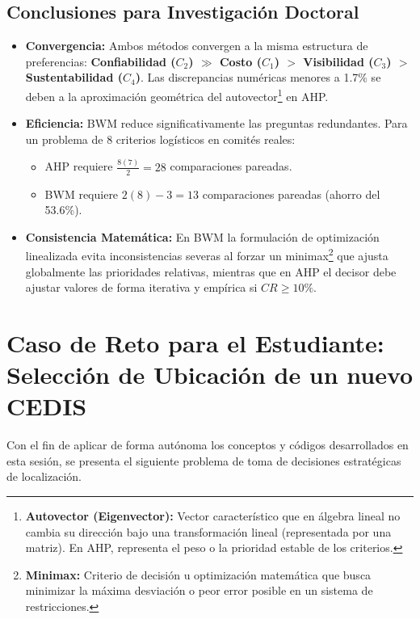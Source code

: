\documentclass[11pt, letterpaper]{article}
\begin{document}
\subsection{Conclusiones para Investigación Doctoral}
\begin{itemize}
    \item \textbf{Convergencia:} Ambos métodos convergen a la misma estructura de preferencias: \textbf{Confiabilidad ($C_2$) $\gg$ Costo ($C_1$) $>$ Visibilidad ($C_3$) $>$ Sustentabilidad ($C_4$)}. Las discrepancias numéricas menores a 1.7\% se deben a la aproximación geométrica del autovector\footnote{\textbf{Autovector (Eigenvector):} Vector característico que en álgebra lineal no cambia su dirección bajo una transformación lineal (representada por una matriz). En AHP, representa el peso o la prioridad estable de los criterios.} en AHP.
    \item \textbf{Eficiencia:} BWM reduce significativamente las preguntas redundantes. Para un problema de 8 criterios logísticos en comités reales:
          \begin{itemize}
              \item AHP requiere $\frac{8(7)}{2} = 28$ comparaciones pareadas.
              \item BWM requiere $2(8) - 3 = 13$ comparaciones pareadas (ahorro del 53.6\%).
          \end{itemize}
    \item \textbf{Consistencia Matemática:} En BWM la formulación de optimización linealizada evita inconsistencias severas al forzar un minimax\footnote{\textbf{Minimax:} Criterio de decisión u optimización matemática que busca minimizar la máxima desviación o peor error posible en un sistema de restricciones.} que ajusta globalmente las prioridades relativas, mientras que en AHP el decisor debe ajustar valores de forma iterativa y empírica si $CR \ge 10\%$.
\end{itemize}

\section{Caso de Reto para el Estudiante: Selección de Ubicación de un nuevo CEDIS}

Con el fin de aplicar de forma autónoma los conceptos y códigos desarrollados en esta sesión, se presenta el siguiente problema de toma de decisiones estratégicas de localización.
\end{document}
